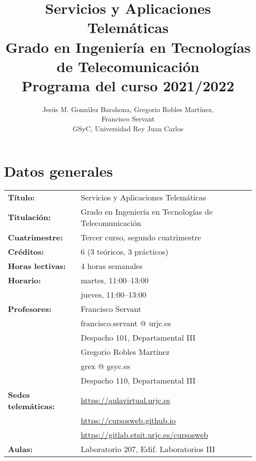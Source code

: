 \documentclass[a4paper,12pt]{article}
\title{Servicios y Aplicaciones Telemáticas \\
Grado en Ingeniería en Tecnologías de Telecomunicación \\
Programa del curso 2021/2022}
\author{Jesús M. González Barahona, Gregorio Robles Martínez, \\
  Francisco Servant \\
GSyC, Universidad Rey Juan Carlos}
\begin{document}
\maketitle

\tableofcontents

\newpage

\section{Datos generales}

\begin{tabular}{ll}
\textbf{Título:} & Servicios y Aplicaciones Telemáticas \\
\textbf{Titulación:} & Grado en Ingeniería en Tecnologías de Telecomunicación \\
\textbf{Cuatrimestre:} & Tercer curso, segundo cuatrimestre \\
\textbf{Créditos:} & 6 (3 teóricos, 3 prácticos) \\
\textbf{Horas lectivas:} & 4 horas semanales \\
\textbf{Horario:} & martes, 11:00--13:00 \\
                  & jueves, 11:00--13:00 \\
\textbf{Profesores:}
& Francisco Servant \\
& \hspace{1cm}francisco.servant @ urjc.es \\
& \hspace{1cm}Despacho 101, Departamental III\\
& Gregorio Robles Martínez\\
& \hspace{1cm}grex @ gsyc.es \\
& \hspace{1cm}Despacho 110, Departamental III\\
\textbf{Sedes telemáticas:} & \url{https://aulavirtual.urjc.es} \\
                            & \url{https://cursosweb.github.io} \\
                            & \url{https://gitlab.etsit.urjc.es/cursosweb} \\
\textbf{Aulas:} & Laboratorio 207, Edif. Laboratorios III
\end{tabular}
\end{document}
